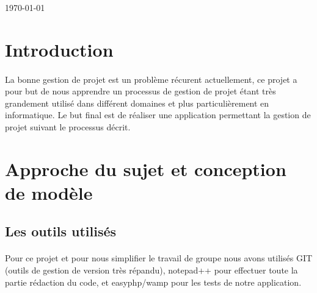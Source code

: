 \documentclass[a4paper, 12pt]{article}
\begin{document}
\begin{titlepage}
{\large \today}\\[3cm] 


 

\vfill

\end{titlepage}



\setcounter{page}{1}
\tableofcontents
\newpage



\section{Introduction}
\paragraph{}La bonne gestion de projet est un problème récurent actuellement, ce projet a pour but de nous apprendre un processus de gestion de projet étant très grandement utilisé dans différent domaines et plus particulièrement en informatique. Le but final est de réaliser une application permettant la gestion de projet suivant le processus décrit.

\newpage

\section{Approche du sujet et conception de modèle}

\subsection{Les outils utilisés}
\paragraph{}Pour ce projet et pour nous simplifier le travail de groupe nous avons utilisés GIT (outils de gestion de version très répandu), notepad++ pour effectuer toute la partie rédaction du code, et easyphp/wamp pour les tests de notre application.
\end{document}
